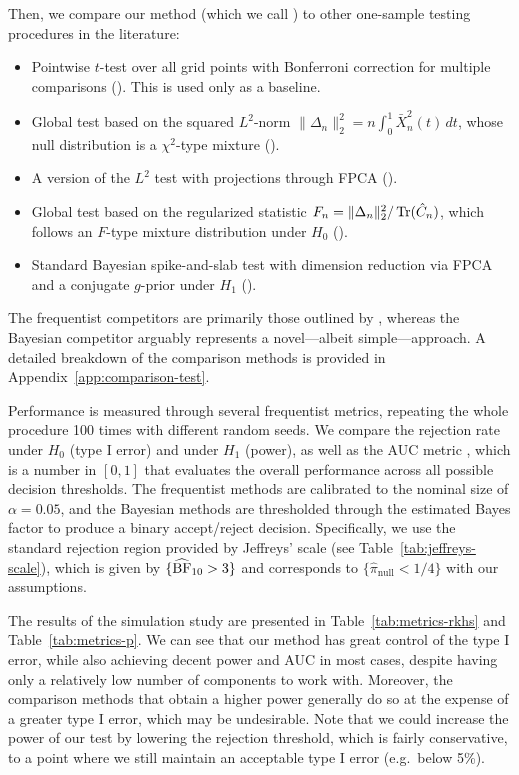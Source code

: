 Then, we compare our method (which we call ) to other one-sample testing procedures in the literature:
\begin{itemize}
  \item Pointwise \(t\)-test over all grid points with Bonferroni correction for multiple comparisons (). This is used only as a baseline.
  \item Global test based on the squared \(L^2\)-norm \(\|\Delta_n\|_2^2 = n\int_0^1 \bar{X}_n^2(t)\, dt\), whose null distribution is a \(\chi^2\)-type mixture ().
  \item A version of the \(L^2\) test with projections through \acs{FPCA} ().
  \item Global test based on the regularized statistic \(F_n=\|\Delta_n\|_2^2/\operatorname{Tr}(\hat{C}_n)\), which follows an \(F\)-type mixture distribution under \(H_0\) ().
  \item Standard Bayesian spike-and-slab test with dimension reduction via \acs{FPCA} and a conjugate \(g\)-prior under \(H_1\) ().
\end{itemize}
The frequentist competitors are primarily those outlined by \citet{zhang2013analysis}, whereas the Bayesian competitor arguably represents a novel---albeit simple---approach. A detailed breakdown of the comparison methods is provided in Appendix~\ref{app:comparison-test}.

Performance is measured through several frequentist metrics, repeating the whole procedure 100 times with different random seeds. We compare the rejection rate under \(H_0\) (type I error) and under \(H_1\) (power), as well as the \acf{AUC} metric \citep{krzanowski2009roc}, which is a number in \([0,1]\) that evaluates the overall performance across all possible decision thresholds. The frequentist methods are calibrated to the nominal size of \(\alpha=0.05\), and the Bayesian methods are thresholded through the estimated Bayes factor to produce a binary accept/reject decision. Specifically, we use the standard rejection region provided by Jeffreys' scale (see Table~\ref{tab:jeffreys-scale}), which is given by \(\{\widehat{\operatorname{\text{BF}}}_{10}>3\}\) and corresponds to \(\{\hat\pi_{\text{null}}<1/4\}\) with our assumptions. 

The results of the simulation study are presented in Table~\ref{tab:metrics-rkhs} and Table~\ref{tab:metrics-p}. We can see that our  method has great control of the type I error, while also achieving decent power and \acs{AUC} in most cases, despite having only a relatively low number of components to work with. Moreover, the comparison methods that obtain a higher power generally do so at the expense of a greater type I error, which may be undesirable. Note that we could increase the power of our test by lowering the rejection threshold, which is fairly conservative, to a point where we still maintain an acceptable type I error (e.g.\ below 5\%). 

